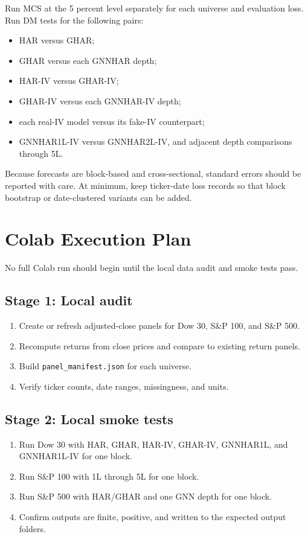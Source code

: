\documentclass[11pt,a4paper]{article}
\begin{document}
Run MCS at the 5 percent level separately for each universe and evaluation loss. Run DM tests for the following pairs:
\begin{itemize}[leftmargin=*]
  \item HAR versus GHAR;
  \item GHAR versus each GNNHAR depth;
  \item HAR-IV versus GHAR-IV;
  \item GHAR-IV versus each GNNHAR-IV depth;
  \item each real-IV model versus its fake-IV counterpart;
  \item GNNHAR1L-IV versus GNNHAR2L-IV, and adjacent depth comparisons through 5L.
\end{itemize}

Because forecasts are block-based and cross-sectional, standard errors should be reported with care. At minimum, keep ticker-date loss records so that block bootstrap or date-clustered variants can be added.

\section{Colab Execution Plan}

No full Colab run should begin until the local data audit and smoke tests pass.

\subsection*{Stage 1: Local audit}
\begin{enumerate}[leftmargin=*]
  \item Create or refresh adjusted-close panels for Dow 30, S\&P 100, and S\&P 500.
  \item Recompute returns from close prices and compare to existing return panels.
  \item Build \texttt{panel\_manifest.json} for each universe.
  \item Verify ticker counts, date ranges, missingness, and units.
\end{enumerate}

\subsection*{Stage 2: Local smoke tests}
\begin{enumerate}[leftmargin=*]
  \item Run Dow 30 with HAR, GHAR, HAR-IV, GHAR-IV, GNNHAR1L, and GNNHAR1L-IV for one block.
  \item Run S\&P 100 with 1L through 5L for one block.
  \item Run S\&P 500 with HAR/GHAR and one GNN depth for one block.
  \item Confirm outputs are finite, positive, and written to the expected output folders.
\end{enumerate}
\end{document}
